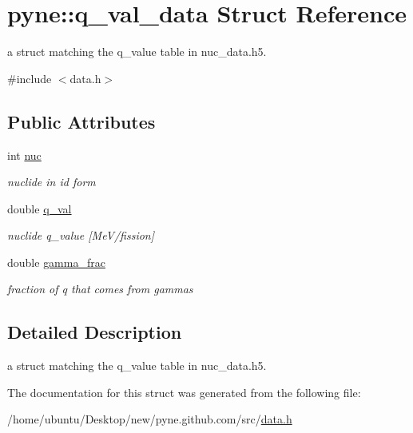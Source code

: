 \hypertarget{structpyne_1_1q__val__data}{}\section{pyne\+:\+:q\+\_\+val\+\_\+data Struct Reference}
\label{structpyne_1_1q__val__data}


a struct matching the q\+\_\+value table in nuc\+\_\+data.\+h5.  




{\ttfamily \#include $<$data.\+h$>$}

\subsection*{Public Attributes}
\begin{DoxyCompactItemize}
\item 
int \hyperlink{structpyne_1_1q__val__data_a39dbf1ad0347f0f68f09c94a9ff9157f}{nuc}\hypertarget{structpyne_1_1q__val__data_a39dbf1ad0347f0f68f09c94a9ff9157f}{}\label{structpyne_1_1q__val__data_a39dbf1ad0347f0f68f09c94a9ff9157f}

\begin{DoxyCompactList}\small\item\em nuclide in id form \end{DoxyCompactList}\item 
double \hyperlink{structpyne_1_1q__val__data_a8016ec428535fddb8cba5005511d4a8a}{q\+\_\+val}\hypertarget{structpyne_1_1q__val__data_a8016ec428535fddb8cba5005511d4a8a}{}\label{structpyne_1_1q__val__data_a8016ec428535fddb8cba5005511d4a8a}

\begin{DoxyCompactList}\small\item\em nuclide q\+\_\+value \mbox{[}Me\+V/fission\mbox{]} \end{DoxyCompactList}\item 
double \hyperlink{structpyne_1_1q__val__data_a5d47c172a924715d567a1b6119e20830}{gamma\+\_\+frac}\hypertarget{structpyne_1_1q__val__data_a5d47c172a924715d567a1b6119e20830}{}\label{structpyne_1_1q__val__data_a5d47c172a924715d567a1b6119e20830}

\begin{DoxyCompactList}\small\item\em fraction of q that comes from gammas \end{DoxyCompactList}\end{DoxyCompactItemize}


\subsection{Detailed Description}
a struct matching the q\+\_\+value table in nuc\+\_\+data.\+h5. 

The documentation for this struct was generated from the following file\+:\begin{DoxyCompactItemize}
\item 
/home/ubuntu/\+Desktop/new/pyne.\+github.\+com/src/\hyperlink{data_8h}{data.\+h}\end{DoxyCompactItemize}
